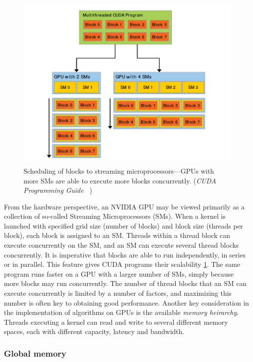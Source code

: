\begin{figure}
\begin{center}
\includegraphics[height=250pt]{img/gpu-scaling.png}
\end{center}
\caption{Scheduling of blocks to streaming microprocessors---GPUs
    with more SMs are able to execute more blocks concurrently.
(\emph{CUDA Programming Guide ~\cite{CUDAProgrammingGuide}})}
\label{fig:gpu-scaling}
\end{figure}

From the hardware perspective,
an NVIDIA GPU may be viewed primarily as
a collection of so-called Streaming Microprocessors (SMs).
When a kernel is launched with specified
grid size (number of blocks)
and block size (threads per block),
each block is assigned to an SM.
Threads within a thread block can execute concurrently on the SM,
and an SM can execute several thread blocks concurrently.
It is imperative that blocks are able to run
independently, in series or in parallel.
This feature gives CUDA programs
their scalability \ref{fig:gpu-scaling}.
The same program runs faster on a GPU with a larger number
of SMs, simply because more blocks may run concurrently.
The number of thread blocks that an
SM can execute concurrently
is limited by a number of factors,
and maximizing this number is often
key to obtaining good performance.
Another key consideration in the implementation
of algorithms on GPUs is the
available \emph{memory heirarchy}.
Threads executing a kernel can read and write
to several different memory spaces,
each with different capacity, latency and bandwidth.

\subsubsection{Global memory}

